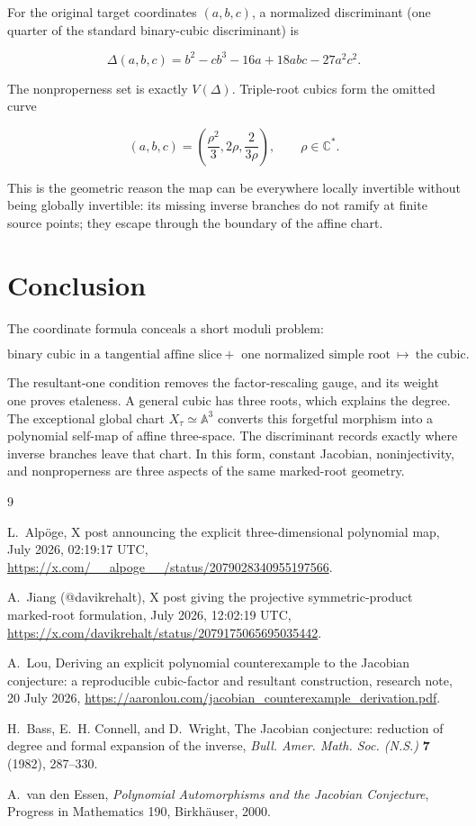 \documentclass[11pt,a4paper]{article}
\theoremstyle{remark}
\newcommand{\A}{\mathbb A}
\newcommand{\C}{\mathbb C}
\begin{document}
For the original target coordinates $(a,b,c)$, a normalized discriminant
(one quarter of the standard binary-cubic discriminant) is

\[
  \Delta(a,b,c)
  =b^2-cb^3-16a+18abc-27a^2c^2.
\]

The nonproperness set is exactly $V(\Delta)$.  Triple-root cubics form the
omitted curve

\[
  (a,b,c)=
  \left(\frac{\rho^2}{3},2\rho,\frac{2}{3\rho}\right),
  \qquad \rho\in\C^*.
\]

This is the geometric reason the map can be everywhere locally invertible
without being globally invertible: its missing inverse branches do not
ramify at finite source points; they escape through the boundary of the
affine chart.

\section{Conclusion}

The coordinate formula conceals a short moduli problem:

\[
  \boxed{
  \text{binary cubic in a tangential affine slice}
  +\text{ one normalized simple root}
  \ \longmapsto\ \text{the cubic}.}
\]

The resultant-one condition removes the factor-rescaling gauge, and its
weight one proves etaleness.  A general cubic has three roots, which explains
the degree.  The exceptional global chart
$X_\tau\simeq\A^3$ converts this forgetful morphism into a polynomial
self-map of affine three-space.  The discriminant records exactly where
inverse branches leave that chart.  In this form, constant Jacobian,
noninjectivity, and nonproperness are three aspects of the same marked-root
geometry.

\begin{thebibliography}{9}

L.~Alp\"oge,
\newblock X post announcing the explicit three-dimensional polynomial map,
 July 2026, 02:19:17 UTC,
\newblock \url{https://x.com/__alpoge__/status/2079028340955197566}.

A.~Jiang (@davikrehalt),
\newblock X post giving the projective symmetric-product marked-root
  formulation,
 July 2026, 12:02:19 UTC,
\newblock \url{https://x.com/davikrehalt/status/2079175065695035442}.

A.~Lou,
\newblock Deriving an explicit polynomial counterexample to the Jacobian
  conjecture: a reproducible cubic-factor and resultant construction,
\newblock research note, 20 July 2026,
\newblock \url{https://aaronlou.com/jacobian_counterexample_derivation.pdf}.

H.~Bass, E.~H. Connell, and D.~Wright,
\newblock The Jacobian conjecture: reduction of degree and formal expansion
  of the inverse,
\newblock \emph{Bull. Amer. Math. Soc. (N.S.)} \textbf{7} (1982), 287--330.

A.~van den Essen,
\newblock \emph{Polynomial Automorphisms and the Jacobian Conjecture},
\newblock Progress in Mathematics 190, Birkh\"auser, 2000.

\end{thebibliography}
\end{document}
